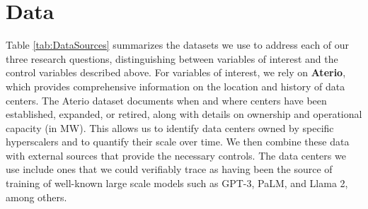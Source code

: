 \documentclass[sigconf,authordraft]{acmart}
\newcommand{\nb}[1]{\textcolor{blue}{NB[#1]}}
\begin{document}
\section{Data}\label{sectionData}
Table \ref{tab:DataSources} summarizes the datasets we use to address each of our three research questions, distinguishing between variables of interest and the control variables described above. For variables of interest, we rely on \textbf{Aterio}, which provides comprehensive information on the location and history of data centers. The Aterio dataset documents when and where centers have been established, expanded, or retired, along with details on ownership and operational capacity (in MW). This allows us to identify data centers owned by specific hyperscalers and to quantify their scale over time. We then combine these data with external sources that provide the necessary controls. 
The data centers we use include ones that we could verifiably trace as having been the source of training of well-known large scale models such as GPT-3, PaLM, and Llama 2, among others.
\end{document}
